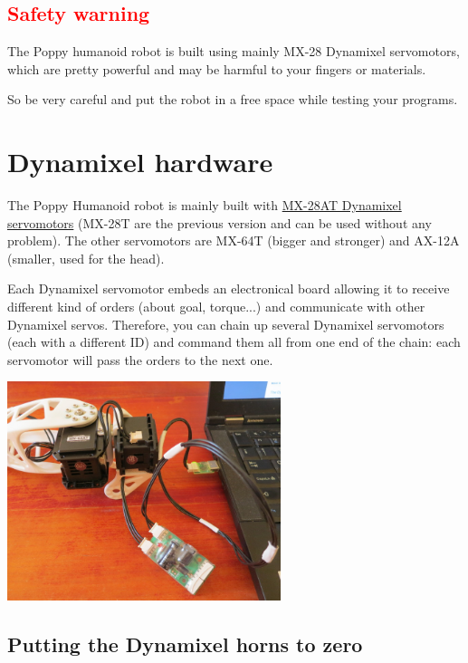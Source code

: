 \documentclass{article}
\begin{document}
\subsection{\textcolor{red}{Safety warning}}

The Poppy humanoid robot is built using mainly MX-28 Dynamixel servomotors, which are pretty powerful and may be harmful to your fingers or materials.

So be very careful and put the robot in a free space while testing your programs.

\section{Dynamixel hardware}

The Poppy Humanoid robot is mainly built with \href{http://www.generationrobots.com/en/401858-servomotor-dynamixel-mx-28at.html}{MX-28AT Dynamixel servomotors} (MX-28T are the previous version and can be used without any problem). The other servomotors are MX-64T (bigger and stronger) and AX-12A (smaller, used for the head).

Each Dynamixel servomotor embeds an electronical board allowing it to receive different kind of orders (about goal, torque...) and communicate with other Dynamixel servos. Therefore, you can chain up several Dynamixel servomotors (each with a different ID) and command them all from one end of the chain: each servomotor will pass the orders to the next one. 

 \begin{center}
  \includegraphics[width=0.6\textwidth]{img/daisy_link}
 \end{center}
 

\subsection{Putting the Dynamixel horns to zero}
\label{dynamixel-zero}
\end{document}
